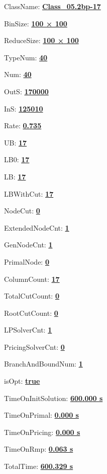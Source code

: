 \documentclass[11pt]{article}
\begin{document}
\pagestyle{empty}


ClassName: \underline{\textbf{Class_05.2bp-17}}
\par
BinSize: \underline{\textbf{100 × 100}}
\par
ReduceSize: \underline{\textbf{100 × 100}}
\par
TypeNum: \underline{\textbf{40}}
\par
Num: \underline{\textbf{40}}
\par
OutS: \underline{\textbf{170000}}
\par
InS: \underline{\textbf{125010}}
\par
Rate: \underline{\textbf{0.735}}
\par
UB: \underline{\textbf{17}}
\par
LB0: \underline{\textbf{17}}
\par
LB: \underline{\textbf{17}}
\par
LBWithCut: \underline{\textbf{17}}
\par
NodeCut: \underline{\textbf{0}}
\par
ExtendedNodeCnt: \underline{\textbf{1}}
\par
GenNodeCnt: \underline{\textbf{1}}
\par
PrimalNode: \underline{\textbf{0}}
\par
ColumnCount: \underline{\textbf{17}}
\par
TotalCutCount: \underline{\textbf{0}}
\par
RootCutCount: \underline{\textbf{0}}
\par
LPSolverCnt: \underline{\textbf{1}}
\par
PricingSolverCnt: \underline{\textbf{0}}
\par
BranchAndBoundNum: \underline{\textbf{1}}
\par
isOpt: \underline{\textbf{true}}
\par
TimeOnInitSolution: \underline{\textbf{600.000 s}}
\par
TimeOnPrimal: \underline{\textbf{0.000 s}}
\par
TimeOnPricing: \underline{\textbf{0.000 s}}
\par
TimeOnRmp: \underline{\textbf{0.063 s}}
\par
TotalTime: \underline{\textbf{600.329 s}}
\par
\newpage


\end{document}
